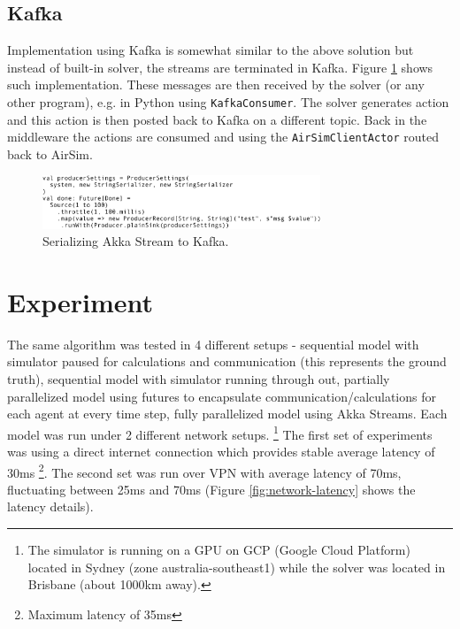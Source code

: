 \documentclass{article}
\begin{document}
%

\subsection{Kafka}
Implementation using Kafka is somewhat similar to the above solution but instead of built-in solver, the streams are terminated in Kafka. Figure \ref{fig:kafka-sink} shows such implementation. These messages are then received by the solver (or any other program), e.g. in Python using \verb|KafkaConsumer|. The solver generates action and this action is then posted back to Kafka on a different topic. Back in the middleware the actions are consumed and using the \verb|AirSimClientActor| routed back to AirSim.

\begin{figure}
	\centering
	\includegraphics[width=8.3cm]{kafka-sink}
	\caption{Serializing Akka Stream to Kafka.}\label{fig:kafka-sink}
\end{figure}


\section{Experiment}
The same algorithm was tested in 4 different setups - sequential model with simulator paused for calculations and communication (this represents the ground truth), sequential model with simulator running through out, partially parallelized model using futures to encapsulate communication/calculations for each agent at every time step, fully parallelized model using Akka Streams. Each model was run under 2 different network setups. \footnote{The simulator is running on a GPU on GCP (Google Cloud Platform) located in Sydney (zone australia-southeast1) while the solver was located in Brisbane (about 1000km away).} The first set of experiments was using a direct internet connection which provides stable average latency of 30ms \footnote{Maximum latency of 35ms}. The second set was run over VPN with average latency of 70ms, fluctuating between 25ms and 70ms (Figure \ref{fig:network-latency} shows the latency details).
\end{document}
